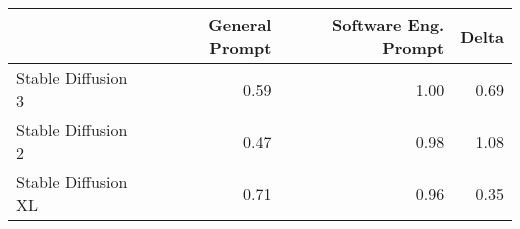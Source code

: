 \begin{tabular}{lrrr}
\toprule
 & General Prompt & Software Eng. Prompt & Delta \\
\midrule
Stable Diffusion 3 & 0.59 & 1.00 & 0.69 \\
Stable Diffusion 2 & 0.47 & 0.98 & 1.08 \\
Stable Diffusion XL & 0.71 & 0.96 & 0.35 \\
\bottomrule
\end{tabular}
